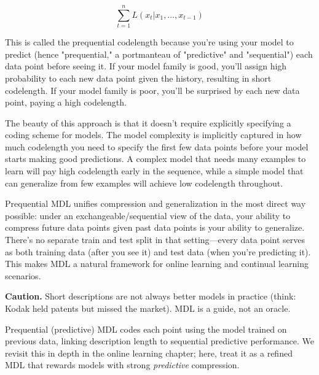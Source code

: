 \vspace{0.3cm}

\begin{equation}
\sum_{t=1}^n L(x_t | x_1, \ldots, x_{t-1})
\end{equation}

\vspace{0.3cm}

This is called the prequential codelength because you're using your model to predict (hence "prequential," a portmanteau of "predictive" and "sequential") each data point before seeing it. If your model family is good, you'll assign high probability to each new data point given the history, resulting in short codelength. If your model family is poor, you'll be surprised by each new data point, paying a high codelength.

\vspace{0.3cm}

The beauty of this approach is that it doesn't require explicitly specifying a coding scheme for models. The model complexity is implicitly captured in how much codelength you need to specify the first few data points before your model starts making good predictions. A complex model that needs many examples to learn will pay high codelength early in the sequence, while a simple model that can generalize from few examples will achieve low codelength throughout.

\vspace{1.5em}

\begin{keyinsight}
Prequential MDL unifies compression and generalization in the most direct way possible: under an exchangeable/sequential view of the data, your ability to compress future data points given past data points is your ability to generalize. There's no separate train and test split in that setting---every data point serves as both training data (after you see it) and test data (when you're predicting it). This makes MDL a natural framework for online learning and continual learning scenarios.
\end{keyinsight}

\vspace{1.5em}


\vspace{0.3cm}
\textbf{Caution.} Short descriptions are not always better models in practice (think: Kodak held patents but missed the market). MDL is a guide, not an oracle.

\vspace{0.3cm}
Prequential (predictive) MDL codes each point using the model trained on previous data, linking description length to sequential predictive performance. We revisit this in depth in the online learning chapter; here, treat it as a refined MDL that rewards models with strong \emph{predictive} compression.
